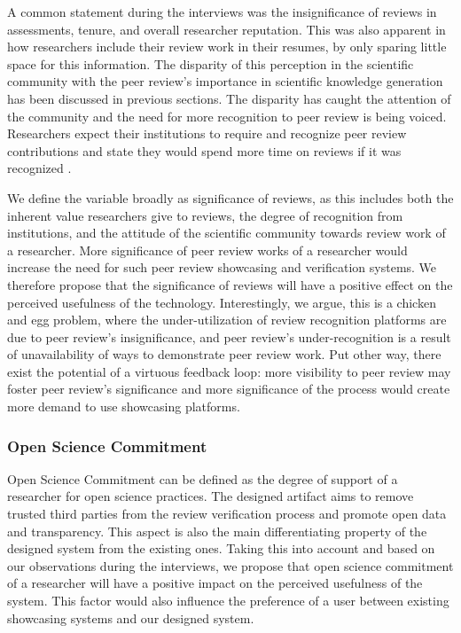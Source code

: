 A common statement during the interviews was the insignificance of reviews in assessments, tenure, and overall researcher reputation. This was also apparent in how researchers include their review work in their resumes, by only sparing little space for this information. The disparity of this perception in the scientific community with the peer review's importance in scientific knowledge generation has been discussed in previous sections. The disparity has caught the attention of the community \parencite{Verissimo.2013, Tennant.2020} and the need for more recognition to peer review is being voiced. Researchers expect their institutions to require and recognize peer review contributions \parencite{Publons.2018} and state they would spend more time on reviews if it was recognized \parencite{Warne.2016}.

We define the variable broadly as significance of reviews, as this includes both the inherent value researchers give to reviews, the degree of recognition from institutions, and the attitude of the scientific community towards review work of a researcher. More significance of peer review works of a researcher would increase the need for such peer review showcasing and verification systems. We therefore propose that the significance of reviews will have a positive effect on the perceived usefulness of the technology. Interestingly, we argue, this is a chicken and egg problem, where the under-utilization of review recognition platforms are due to peer review's insignificance, and peer review's under-recognition is a result of unavailability of ways to demonstrate peer review work. Put other way, there exist the potential of a virtuous feedback loop: more visibility to peer review may foster peer review's significance and more significance of the process would create more demand to use showcasing platforms.

\subsubsection{Open Science Commitment}

Open Science Commitment can be defined as the degree of support of a researcher for open science practices. The designed artifact aims to remove trusted third parties from the review verification process and promote open data and transparency. This aspect is also the main differentiating property of the designed system from the existing ones. Taking this into account and based on our observations during the interviews, we propose that open science commitment of a researcher will have a positive impact on the perceived usefulness of the system. This factor would also influence the preference of a user between existing showcasing systems and our designed system. 


